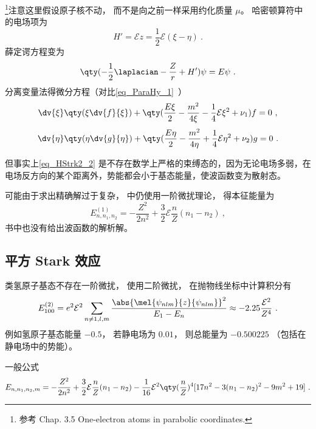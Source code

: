 
\begin{issues}
\issueDraft
\end{issues}


\footnote{参考 \cite{Bransden} Chap. 3.5 One-electron atoms in parabolic coordinates.}注意这里假设原子核不动， 而不是向之前一样采用约化质量 $\mu$。 哈密顿算符中的电场项为
\begin{equation}\label{eq_HStrk2_1}
H' = \mathcal Ez = \frac12 \mathcal E (\xi - \eta)~.
\end{equation}
薛定谔方程变为
\begin{equation}\label{eq_HStrk2_2}
\qty(-\frac12 \laplacian - \frac{Z}{r} + H')\psi = E\psi~.
\end{equation}
分离变量法得微分方程（对比\autoref{eq_ParaHy_1}~）
\begin{equation}
\dv{\xi} \qty(\xi \dv{f}{\xi}) + \qty(\frac{E \xi}{2} - \frac{m^2}{4\xi} -\frac14\mathcal E \xi^2 + \nu_1) f = 0~,
\end{equation}
\begin{equation}
\dv{\eta}\qty(\eta \dv{g}{\eta}) + \qty(\frac{E\eta}{2} - \frac{m^2}{4\eta} +\frac14\mathcal E \eta^2 + \nu_2)g = 0~.
\end{equation}

但事实上\autoref{eq_HStrk2_2} 是不存在数学上严格的束缚态的，因为无论电场多弱，在电场反方向的某个距离外，势能都会小于基态能量，使波函数变为散射态。

可能由于求出精确解过于复杂， \cite{Bransden} 中仍使用一阶微扰理论， 得本征能量为
\begin{equation}
E_{n,n_1,n_2}^{(1)} = -\frac{Z^2}{2n^2} + \frac32 \mathcal E \frac{n}{Z}(n_1 - n_2)~,
\end{equation}
书中也没有给出波函数的解析解。

\subsection{平方 Stark 效应}
类氢原子基态不存在一阶微扰， 使用二阶微扰， 在抛物线坐标中计算积分有
\begin{equation}
E_{100}^{(2)} = e^2\mathcal E^2 \sum_{n\ne 1, l, m} \frac{\abs{\mel{\psi_{nlm}}{z}{\psi_{nlm}}}^2}{E_1 - E_n}
\approx - 2.25\frac{\mathcal E^2}{Z^4}~.
\end{equation}
例如氢原子基态能量 $-0.5$， 若静电场为 $0.01$， 则总能量为 $-0.500225$ （包括在静电场中的势能）。

一般公式
\begin{equation}
E_{n,n_1,n_2,m} = -\frac{Z^2}{2n^2} + \frac32 \mathcal E \frac{n}{Z} (n_1-n_2)
-\frac{1}{16}\mathcal E^2 \qty(\frac{n}{Z})^4 [17n^2-3(n_1-n_2)^2-9m^2+19]~.
\end{equation}
